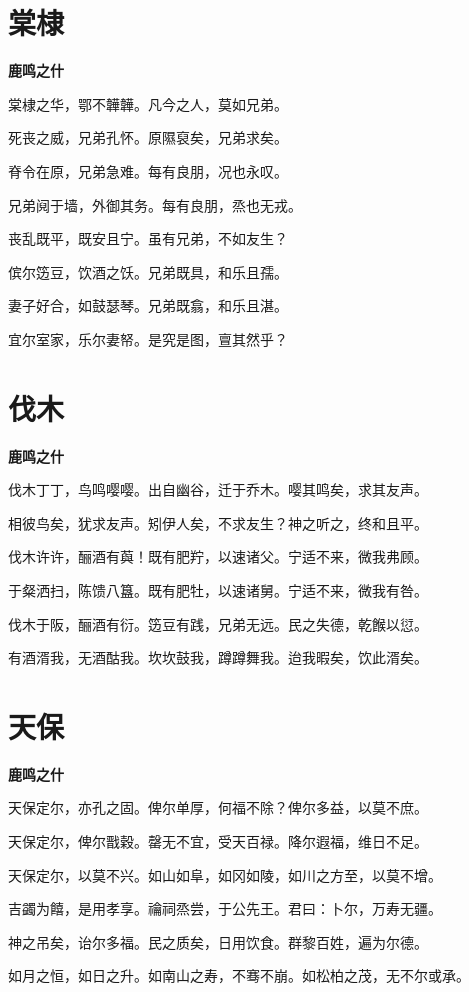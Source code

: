 \documentclass[12pt,a4paper]{ctexbook}
\begin{document}
\section{棠棣}
\textbf{鹿鸣之什}\par\vspace{0.5em}
棠棣之华，鄂不韡韡。凡今之人，莫如兄弟。\par
死丧之威，兄弟孔怀。原隰裒矣，兄弟求矣。\par
脊令在原，兄弟急难。每有良朋，况也永叹。\par
兄弟阋于墙，外御其务。每有良朋，烝也无戎。\par
丧乱既平，既安且宁。虽有兄弟，不如友生？\par
傧尔笾豆，饮酒之饫。兄弟既具，和乐且孺。\par
妻子好合，如鼓瑟琴。兄弟既翕，和乐且湛。\par
宜尔室家，乐尔妻帑。是究是图，亶其然乎？\par

\section{伐木}
\textbf{鹿鸣之什}\par\vspace{0.5em}
伐木丁丁，鸟鸣嘤嘤。出自幽谷，迁于乔木。嘤其鸣矣，求其友声。\par
相彼鸟矣，犹求友声。矧伊人矣，不求友生？神之听之，终和且平。\par
伐木许许，酾酒有藇！既有肥羜，以速诸父。宁适不来，微我弗顾。\par
于粲洒扫，陈馈八簋。既有肥牡，以速诸舅。宁适不来，微我有咎。\par
伐木于阪，酾酒有衍。笾豆有践，兄弟无远。民之失德，乾餱以愆。\par
有酒湑我，无酒酤我。坎坎鼓我，蹲蹲舞我。迨我暇矣，饮此湑矣。\par

\section{天保}
\textbf{鹿鸣之什}\par\vspace{0.5em}
天保定尔，亦孔之固。俾尔单厚，何福不除？俾尔多益，以莫不庶。\par
天保定尔，俾尔戬穀。罄无不宜，受天百禄。降尔遐福，维日不足。\par
天保定尔，以莫不兴。如山如阜，如冈如陵，如川之方至，以莫不增。\par
吉蠲为饎，是用孝享。禴祠烝尝，于公先王。君曰：卜尔，万寿无疆。\par
神之吊矣，诒尔多福。民之质矣，日用饮食。群黎百姓，遍为尔德。\par
如月之恒，如日之升。如南山之寿，不骞不崩。如松柏之茂，无不尔或承。\par
\end{document}
